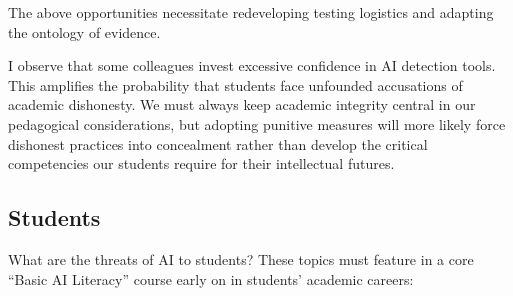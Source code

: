 \documentclass[
  10t,
]{article}
\begin{document}
The above opportunities necessitate redeveloping testing logistics and
adapting the ontology of evidence.

I observe that some colleagues invest excessive confidence in AI
detection tools. This amplifies the probability that students face
unfounded accusations of academic dishonesty. We must always keep
academic integrity central in our pedagogical considerations, but
adopting punitive measures will more likely force dishonest practices
into concealment rather than develop the critical competencies our
students require for their intellectual futures.

\subsection{Students}\label{students}

What are the threats of AI to students? These topics must feature in a
core ``Basic AI Literacy'' course early on in students' academic
careers:
\end{document}
